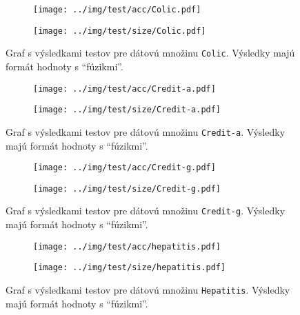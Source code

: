 \setcounter{figure}{0}
\renewcommand{\figurename}{Obrázok}
\begin{figure}[h]
\centering
\begin{subfigure}[b]{0.45\textwidth}
\texttt{[image: ../img/test/acc/Colic.pdf]}
\caption{}
\end{subfigure}
\qquad
\begin{subfigure}[b]{0.45\textwidth}
\texttt{[image: ../img/test/size/Colic.pdf]}
\caption{}
\end{subfigure}
\caption{Graf s výsledkami testov pre dátovú množinu \texttt{Colic}. Výsledky majú formát hodnoty s ``fúzikmi''.}\label{fig:graph1}
\end{figure}

\begin{figure}[h]
\centering
\begin{subfigure}[b]{0.45\textwidth}
\texttt{[image: ../img/test/acc/Credit-a.pdf]}
\caption{}
\end{subfigure}
\qquad
\begin{subfigure}[b]{0.45\textwidth}
\texttt{[image: ../img/test/size/Credit-a.pdf]}
\caption{}
\end{subfigure}
\caption{Graf s výsledkami testov pre dátovú množinu \texttt{Credit-a}. Výsledky majú formát hodnoty s ``fúzikmi''.}\label{fig:graph2}
\end{figure}

\begin{figure}[h]
\centering
\begin{subfigure}[b]{0.45\textwidth}
\texttt{[image: ../img/test/acc/Credit-g.pdf]}
\caption{}
\end{subfigure}
\qquad
\begin{subfigure}[b]{0.45\textwidth}
\texttt{[image: ../img/test/size/Credit-g.pdf]}
\caption{}
\end{subfigure}
\caption{Graf s výsledkami testov pre dátovú množinu \texttt{Credit-g}. Výsledky majú formát hodnoty s ``fúzikmi''.}\label{fig:graph3}
\end{figure}

\begin{figure}[h]
\centering
\begin{subfigure}[b]{0.45\textwidth}
\texttt{[image: ../img/test/acc/hepatitis.pdf]}
\caption{}
\end{subfigure}
\qquad
\begin{subfigure}[b]{0.45\textwidth}
\texttt{[image: ../img/test/size/hepatitis.pdf]}
\caption{}
\end{subfigure}
\caption{Graf s výsledkami testov pre dátovú množinu \texttt{Hepatitis}. Výsledky majú formát hodnoty s ``fúzikmi''.}\label{fig:graph4}
\end{figure}

